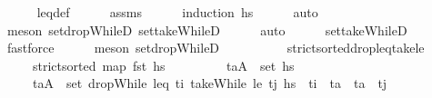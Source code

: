 \begin{isabellebody}
%
\isadelimproof
\ \ \ \ %
\endisadelimproof
%
\isatagproof
{}\isamarkupfalse%
\ leq{\isacharunderscore}{\kern0pt}def\isanewline
\ \ \ \ \isamarkupfalse%
\ assms\isanewline
\ \ \ \ \isamarkupfalse%
\ {\isacharparenleft}{\kern0pt}induction\ hs{\isacharparenright}{\kern0pt}\isanewline
\ \ \ \ \isamarkupfalse%
\ auto\isanewline
\ \ \ \ \isamarkupfalse%
\ {\isacharparenleft}{\kern0pt}meson\ set{\isacharunderscore}{\kern0pt}dropWhileD\ set{\isacharunderscore}{\kern0pt}takeWhileD{\isacharparenright}{\kern0pt}\isanewline
\ \ \ \ \isamarkupfalse%
\ auto{\isacharbrackleft}{\kern0pt}{}{\isacharbrackright}{\kern0pt}\isanewline
\ \ \ \ \isamarkupfalse%
\ set{\isacharunderscore}{\kern0pt}takeWhileD\ \isamarkupfalse%
\ fastforce\isanewline
\ \ \ \ \isamarkupfalse%
\ {\isacharparenleft}{\kern0pt}meson\ set{\isacharunderscore}{\kern0pt}dropWhileD{\isacharparenright}{\kern0pt}{\isacharplus}{\kern0pt}\isanewline
\ \ \ \ \isamarkupfalse%
%
\endisatagproof
{\isafoldproof}%
%
\isadelimproof
%
\endisadelimproof
\ \isanewline
\isanewline
\ \ \isamarkupfalse%
\ strict{\isacharunderscore}{\kern0pt}sorted{\isacharunderscore}{\kern0pt}drop{\isacharunderscore}{\kern0pt}leq{\isacharunderscore}{\kern0pt}take{\isacharunderscore}{\kern0pt}le{\isacharcolon}{\kern0pt}\isanewline
\ \ \ \ \ {\isachardoublequoteopen}strict{\isacharunderscore}{\kern0pt}sorted\ {\isacharparenleft}{\kern0pt}map\ fst\ hs{\isacharparenright}{\kern0pt}{\isachardoublequoteclose}\isanewline
\ \ \ \ \ \ \ \ \ {\isachardoublequoteopen}{\isacharparenleft}{\kern0pt}t\isactrlsub a{\isacharcomma}{\kern0pt}A{\isacharparenright}{\kern0pt}\ {\isasymin}\ set\ hs{\isachardoublequoteclose}\isanewline
\ \ \ \ \ {\isachardoublequoteopen}{\isacharparenleft}{\kern0pt}t\isactrlsub a{\isacharcomma}{\kern0pt}A{\isacharparenright}{\kern0pt}\ {\isasymin}\ set\ {\isacharparenleft}{\kern0pt}dropWhile\ {\isacharparenleft}{\kern0pt}leq\ t\isactrlsub i{\isacharparenright}{\kern0pt}\ {\isacharparenleft}{\kern0pt}takeWhile\ {\isacharparenleft}{\kern0pt}le\ t\isactrlsub j{\isacharparenright}{\kern0pt}\ hs{\isacharparenright}{\kern0pt}{\isacharparenright}{\kern0pt}\ {\isasymlongleftrightarrow}\ t\isactrlsub i\ {\isacharless}{\kern0pt}\ t\isactrlsub a\ {\isasymand}\ t\isactrlsub a\ {\isacharless}{\kern0pt}\ t\isactrlsub j{\isachardoublequoteclose}\isanewline

\end{isabellebody}
